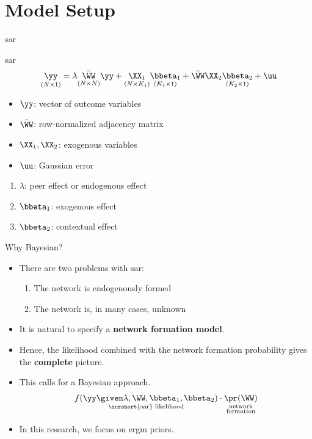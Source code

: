 \documentclass{beamer}
\begin{document}
\section{Model Setup}

\begin{frame}{\acrlong{sar}}
	\begin{block}{\acrshort{sar}}
		\vspace{-1em}
		\begin{align*}
			\underset{(N\times 1)}{\yy}
			= \lambda\underset{(N\times N)}{\bar\WW}\yy
			+ \underset{(N\times K_1)}{\XX_{1}}\underset{(K_1\times 1)}{\bbeta_1}
			+ \bar\WW\XX_{2}\underset{(K_2\times 1)}{\bbeta_2}
			+ \uu
		\end{align*}
	\end{block}
	\begin{itemize}
		\item $\yy$: vector of outcome variables
		\item $\bar\WW$: row-normalized adjacency matrix
		\item $\XX_{1},\XX_{2}$: exogenous variables
		\item $\uu$: Gaussian error
	\end{itemize}
	\begin{enumerate}
		\item $\lambda$: peer effect or endogenous effect
		\item $\bbeta_1$: exogenous effect
		\item $\bbeta_2$: contextual effect
	\end{enumerate}
\end{frame}

\begin{frame}{Why Bayesian?}
	\begin{itemize}
		\item
			There are two problems with \acrshort{sar}:
			\begin{enumerate}
				\item The network is endogenously formed
				\item The network is, in many cases, unknown
			\end{enumerate}
		\item
			It is natural to specify a \textbf{network formation model}.
		\item
			Hence, the likelihood combined with the network formation probability gives the \textbf{complete} picture.
		\item
			This calls for a Bayesian approach.
			\begin{align*}
				\underset{\text{\acrshort{sar} likelihood}}{f(\yy\given\lambda,\WW,\bbeta_1,\bbeta_2)}
				\cdot
				\underset{\substack{\text{network}\\\text{formation}}}{\pr(\WW)}
			\end{align*}
		\item
			In this research, we focus on \acrshort{ergm} priors.
	\end{itemize}
\end{frame}
\end{document}
